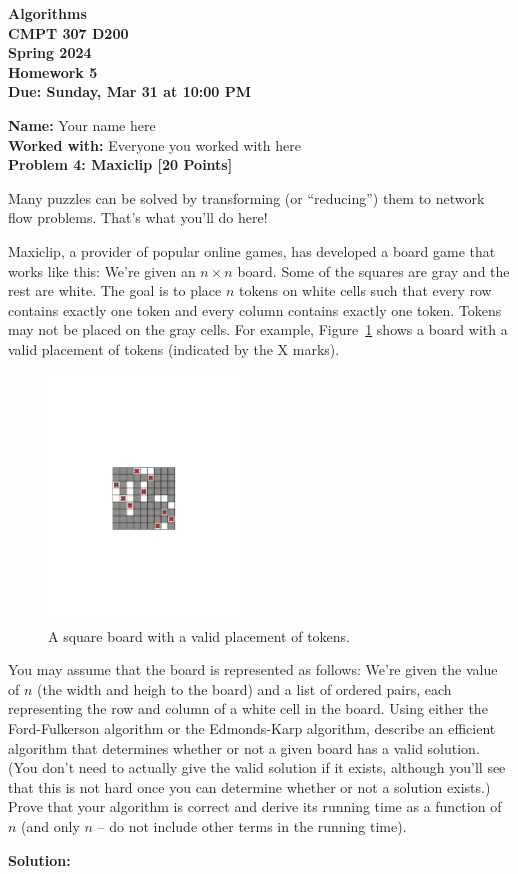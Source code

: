 \documentclass[12pt]{article}
\newcommand{\Name}[1]{\noindent \textbf{Name:} #1 \\}
\newcommand{\Workedwith}[1]{\noindent \textbf{Worked with:} #1 \\}
\newcommand{\Problem}[3]{\mbox{} \newline \noindent \textbf{\textbf{Problem #1: #2 [#3 Points] \\ }}}
\begin{document}
\begin{center}
  \bf
  Algorithms \\
  CMPT 307 D200 \\
  Spring 2024 \\
  \rm
  Homework 5\\
  Due:  Sunday, Mar 31 at 10:00 PM \\
\end{center}

\Name{Your name here}
\Workedwith{Everyone you worked with here}

\Problem{4}{Maxiclip}{20}

Many puzzles can be solved by transforming (or ``reducing'') them to network flow problems.  That's what you'll do here!

Maxiclip, a provider of popular online games, has developed a board game that works like this:  We're given an $n \times n$ board.  Some of the squares are gray and the rest are white.  The goal is to place $n$ tokens on white cells such that every row contains exactly one token and every column contains exactly one token.  Tokens may not be placed on the gray cells.
For example, Figure~\ref{fig:boardgame} shows a board with a valid placement of tokens (indicated by the X marks).

\begin{figure}[h]
\begin{center}
\includegraphics[width=2in]{Board.pdf}
\end{center}
\caption{A square board with a valid placement of tokens.}
\label{fig:boardgame}
\end{figure}

You may assume that the board is represented as follows:  We're given the value of $n$ (the width and heigh to the board) and a list of ordered pairs, each representing the row and column of a white cell in the board.
Using either the Ford-Fulkerson algorithm or the Edmonds-Karp algorithm, describe an efficient algorithm that determines whether or not a given board has a valid solution.  (You don't need to actually give the valid solution if it exists, although you'll see that this is not hard once you can determine whether or not a solution exists.)  Prove that your algorithm is correct and derive its running time as a function of $n$ (and only $n$ -- do not include other terms in the running time).

\textbf{Solution:}
\end{document}
